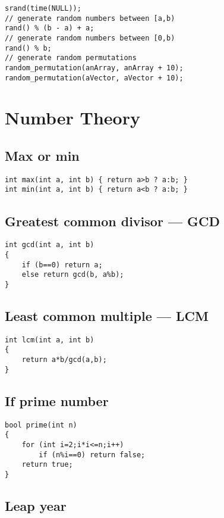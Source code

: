 \documentclass[a4paper]{article}
\begin{document}
\begin{verbatim}
srand(time(NULL));
// generate random numbers between [a,b)
rand() % (b - a) + a;
// generate random numbers between [0,b)
rand() % b; 
// generate random permutations
random_permutation(anArray, anArray + 10);
random_permutation(aVector, aVector + 10);
\end{verbatim}
	
\section{Number Theory}

\subsection{Max or min}
\begin{verbatim}
int max(int a, int b) { return a>b ? a:b; }
int min(int a, int b) { return a<b ? a:b; }
\end{verbatim}

\subsection{Greatest common divisor --- GCD}

\begin{verbatim}
int gcd(int a, int b)
{
	if (b==0) return a;
	else return gcd(b, a%b);
}
\end{verbatim}

\subsection{Least common multiple --- LCM}

\begin{verbatim}
int lcm(int a, int b)
{
	return a*b/gcd(a,b);
}
\end{verbatim}

\subsection{If prime number}

\begin{verbatim}
bool prime(int n)
{
	for (int i=2;i*i<=n;i++)
		if (n%i==0) return false;
	return true;
}
\end{verbatim}

\subsection{Leap year}
\end{document}
